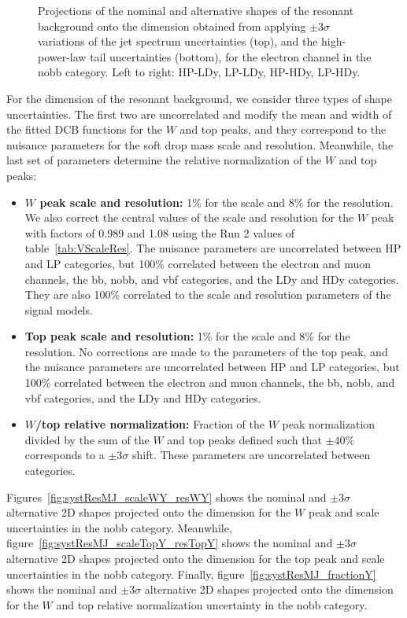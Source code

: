 \begin{figure}[htbp]
  \caption{
    Projections of the nominal and alternative shapes of the resonant background onto the \MVV dimension obtained from applying $\pm3\sigma$ variations of the jet \pt spectrum uncertainties (top), and the high-\MVV power-law tail uncertainties (bottom), for the electron channel in the nobb category.
    Left to right: HP-LDy, LP-LDy, HP-HDy, LP-HDy.
  }
  \label{fig:systResMVV_MVVScale_Tail}
\end{figure}

For the \MJ dimension of the resonant background, we consider three types of shape uncertainties.
The first two are uncorrelated and modify the mean and width of the fitted DCB functions for the $W$ and top peaks, and they correspond to the nuisance parameters for the soft drop mass scale and resolution.
Meanwhile, the last set of parameters determine the relative normalization of the $W$ and top peaks:
\begin{itemize}
  \item {\bfseries $W$ peak scale and resolution:} 1\% for the scale and 8\% for the resolution.
  We also correct the central values of the scale and resolution for the $W$ peak with factors of 0.989 and 1.08 using the Run 2 values of table~\ref{tab:VScaleRes}.
  The nuisance parameters are uncorrelated between HP and LP categories, but 100\% correlated between the electron and muon channels, the bb, nobb, and vbf categories, and the LDy and HDy categories.
  They are also 100\% correlated to the \MJ scale and resolution parameters of the signal models.
  \item {\bfseries Top peak scale and resolution:} 1\% for the scale and 8\% for the resolution.
  No corrections are made to the parameters of the top peak, and the nuisance parameters are uncorrelated between HP and LP categories, but 100\% correlated between the electron and muon channels, the bb, nobb, and vbf categories, and the LDy and HDy categories.
  \item {\bfseries $W$/top relative normalization:} Fraction of the $W$ peak normalization divided by the sum of the $W$ and top peaks defined such that $\pm40\%$ corresponds to a $\pm3\sigma$ shift.
  These parameters are uncorrelated between categories.
\end{itemize}
Figures~\ref{fig:systResMJ_scaleWY_resWY} shows the nominal and $\pm3\sigma$ alternative 2D shapes projected onto the \MJ dimension for the $W$ peak and scale uncertainties in the nobb category.
Meanwhile, figure~\ref{fig:systResMJ_scaleTopY_resTopY} shows the nominal and $\pm3\sigma$ alternative 2D shapes projected onto the \MJ dimension for the top peak and scale uncertainties in the nobb category.
Finally, figure~\ref{fig:systResMJ_fractionY} shows the nominal and $\pm3\sigma$ alternative 2D shapes projected onto the \MJ dimension for the $W$ and top relative normalization uncertainty in the nobb category.

